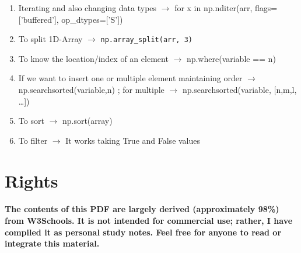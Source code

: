 \documentclass[openany]{book}
\begin{document}
\begin{enumerate}
    \item Iterating and also changing data types $\rightarrow$ for x in np.nditer(arr, flags=['buffered'], op\_dtypes=['S'])
    \item To split 1D-Array $\rightarrow$ \lstinline{np.array_split(arr, 3)}
    \item To know the location/index of an element $\rightarrow$ np.where(variable == n)
    \item If we want to insert one or multiple element maintaining order $\rightarrow$ np.searchsorted(variable,n) ; for multiple $\rightarrow$ np.searchsorted(variable, [n,m,l, \dots])
    \item To sort $\rightarrow$ np.sort(array)
    \item To filter $\rightarrow$ It works taking True and False values
\end{enumerate}

\newpage

\section{Rights}

\paragraph{The contents of this PDF are largely derived (approximately 98\%) from W3Schools. It is not intended for commercial use; rather, I have compiled it as personal study notes. Feel free for anyone to read or integrate this material.}

\cleardoublepage
\end{document}
